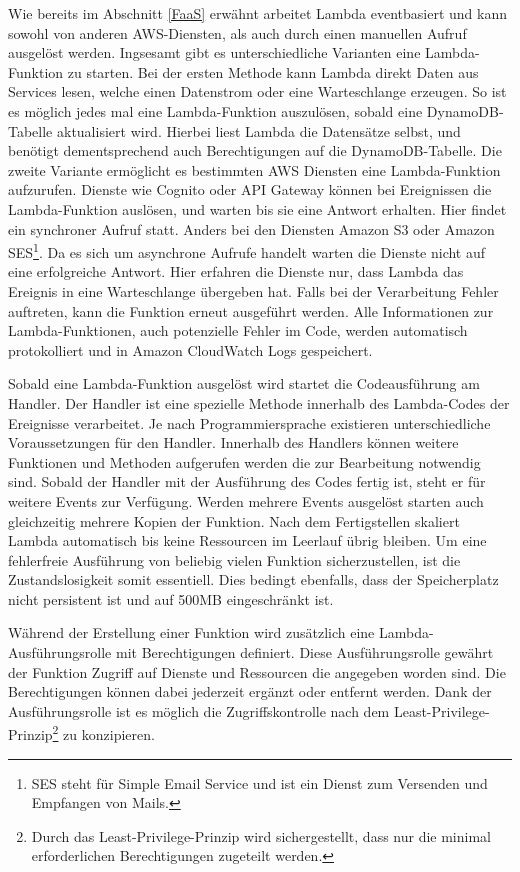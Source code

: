 {Wie bereits im Abschnitt \frqq \ref{FaaS}  \flqq{} erwähnt arbeitet Lambda eventbasiert und kann sowohl von anderen AWS-Diensten, als auch durch einen manuellen Aufruf ausgelöst werden.
Ingsesamt gibt es unterschiedliche Varianten eine Lambda-Funktion zu starten.
Bei der ersten Methode kann Lambda direkt Daten aus Services lesen, welche einen Datenstrom oder eine Warteschlange erzeugen.
So ist es möglich jedes mal eine Lambda-Funktion auszulösen, sobald eine DynamoDB-Tabelle aktualisiert wird.
Hierbei liest Lambda die Datensätze selbst, und benötigt dementsprechend auch Berechtigungen auf die DynamoDB-Tabelle.\cite[]{LambdaDynamo}
Die zweite Variante ermöglicht es bestimmten AWS Diensten eine Lambda-Funktion aufzurufen.
Dienste wie Cognito oder API Gateway können bei Ereignissen die Lambda-Funktion auslösen, und warten bis sie eine Antwort erhalten.
Hier findet ein synchroner Aufruf statt.
Anders bei den Diensten Amazon S3 oder Amazon SES\footnote{SES steht für Simple Email Service und ist ein Dienst zum Versenden und Empfangen von Mails.}. Da es sich um asynchrone Aufrufe handelt warten die Dienste nicht auf eine erfolgreiche Antwort.
Hier erfahren die Dienste nur, dass Lambda das Ereignis in eine Warteschlange übergeben hat.
Falls bei der Verarbeitung Fehler auftreten, kann die Funktion erneut ausgeführt werden.
Alle Informationen zur Lambda-Funktionen, auch potenzielle Fehler im Code, werden automatisch protokolliert und in Amazon CloudWatch Logs gespeichert.
\cite[]{LambdaDienste}

Sobald eine Lambda-Funktion ausgelöst wird startet die Codeausführung am Handler.
Der Handler ist eine spezielle Methode innerhalb des Lambda-Codes der Ereignisse verarbeitet.
Je nach Programmiersprache existieren unterschiedliche Voraussetzungen für den Handler.
Innerhalb des Handlers können weitere Funktionen und Methoden aufgerufen werden die zur Bearbeitung notwendig sind.
Sobald der Handler mit der Ausführung des Codes fertig ist, steht er für weitere Events zur Verfügung.
Werden mehrere Events ausgelöst starten auch gleichzeitig mehrere Kopien der Funktion.
Nach dem Fertigstellen skaliert Lambda automatisch bis keine Ressourcen im Leerlauf übrig bleiben.
Um eine fehlerfreie Ausführung von beliebig vielen Funktion sicherzustellen, ist die Zustandslosigkeit somit essentiell.
Dies bedingt ebenfalls, dass der Speicherplatz nicht persistent ist und auf 500MB eingeschränkt ist.\cite[]{AWSWhitepaper}

Während der Erstellung einer Funktion wird zusätzlich eine Lambda-Ausführungsrolle mit Berechtigungen definiert.
Diese Ausführungsrolle gewährt der Funktion Zugriff auf Dienste und Ressourcen die angegeben worden sind.
Die Berechtigungen können dabei jederzeit ergänzt oder entfernt werden.
Dank der Ausführungsrolle ist es möglich die Zugriffskontrolle nach dem Least-Privilege-Prinzip\footnote{Durch das Least-Privilege-Prinzip wird sichergestellt, dass nur die minimal erforderlichen Berechtigungen zugeteilt werden. } zu konzipieren.


}
